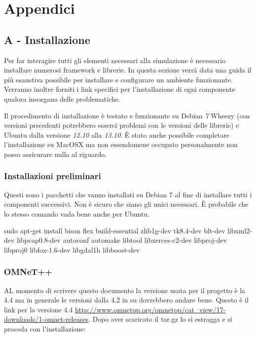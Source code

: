 \chapter{Appendici}

\section{A - Installazione}

Per far interagire tutti gli elementi necessari alla simulazione è necessario installare numerosi framework e librerie. In questa sezione verrà data una guida il più esaustiva possibile per installare e configurare un ambiente funzionante. Verranno inoltre forniti i link specifici per l'installazione di ogni componente qualora insorgano delle problematiche.

Il procedimento di installazione è testato e funzionante su Debian \emph{7} Wheezy (con versioni precedenti potrebbero esserci problemi con le versioni delle librerie) e Ubuntu dalla versione \emph{12.10} alla \emph{13.10}. È stato anche possibile completare l'installazione su MacOSX ma non essendomene occupato personalmente non posso assicurare nulla al riguardo.

\subsection{Installazioni preliminari}

Questi sono i pacchetti che vanno installati su Debian 7 al fine di installare tutti i componenti successivi. Non è sicuro che siano gli unici necessari. È probabile che lo stesso comando vada bene anche per Ubuntu.

\begin{bash}
sudo apt-get install bison flex build-essential zlib1g-dev tk8.4-dev blt-dev libxml2-dev libpcap0.8-dev autoconf automake libtool libxerces-c2-dev libproj-dev libproj0 libfox-1.6-dev libgdal1h libboost-dev
\end{bash}

\subsection{OMNeT++} 

AL momento di scrivere questo documento la versione usata per il progetto è la 4.4 ma in generale le versioni dalla 4.2 in su dovrebbero andare bene. Questo è il link per la versione 4.4 \url{http://www.omnetpp.org/omnetpp/cat_view/17-downloads/1-omnet-releases}. Dopo aver scaricato il tar.gz lo si estragga e si proceda con l'installazione:

